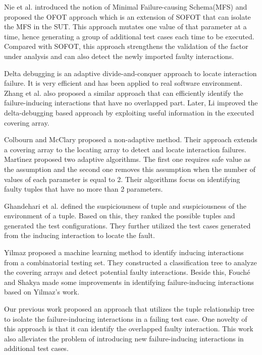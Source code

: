 {Nie et al. \cite{nie2011minimal} introduced the notion of Minimal Failure-causing Schema(MFS) and proposed the OFOT approach which is an extension of SOFOT that can isolate the MFS in the SUT. This approach mutates one value of that parameter at a time, hence generating a group of additional test cases each time to be executed. Compared with SOFOT, this approach  strengthens the validation of the factor under analysis and can also detect the newly imported faulty interactions.

Delta debugging \cite{zeller2002simplifying} is an adaptive divide-and-conquer approach to locate interaction failure. It is very efficient and has been applied to real software environment. Zhang et al. \cite{zhang2011characterizing} also proposed a similar approach that can efficiently identify the failure-inducing interactions that have no overlapped part. Later, Li \cite{li2012improved} improved the delta-debugging based approach by exploiting useful information in the executed covering array.

Colbourn and McClary \cite{colbourn2008locating} proposed a non-adaptive method. Their approach extends a covering array to the locating array to detect and locate interaction failures. Mart{\'\i}nez \cite{martinez2008algorithms,martinez2009locating} proposed two adaptive algorithms. The first one requires safe value as the assumption and the second one removes this assumption when the number of values of each parameter is equal to 2. Their algorithms focus on identifying faulty tuples that have no more than 2 parameters.

Ghandehari et al. \cite{ghandehari2012identifying} defined the suspiciousness of tuple and suspiciousness of the environment of a tuple. Based on this, they ranked the possible tuples and generated the test configurations. They \cite{ghandehari2013fault} further utilized the test cases generated from the inducing interaction to locate the fault.

Yilmaz \cite{yilmaz2006covering} proposed a machine learning method to identify inducing interactions from a combinatorial testing set. They constructed a classification tree to analyze the covering arrays and detect potential faulty interactions. Beside this, Fouch{\'e} \cite{fouche2009incremental} and Shakya \cite{shakya2012isolating} made some improvements in identifying failure-inducing interactions based on Yilmaz's work.

Our previous work \cite{niu2013identifying} proposed an approach that utilizes the tuple relationship tree to isolate the failure-inducing interactions in a failing test case. One novelty of this approach is that it can identify the overlapped faulty interaction. This work also alleviates the problem of introducing new failure-inducing interactions in additional test cases.



}
